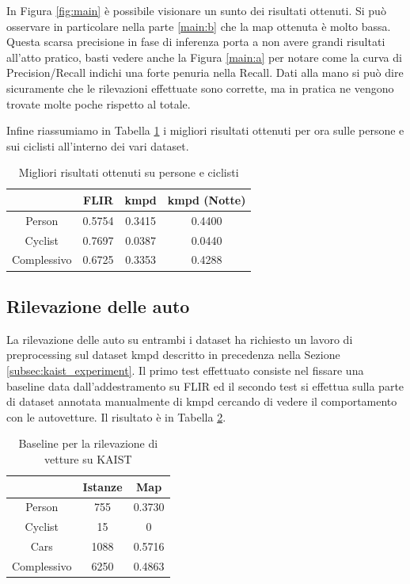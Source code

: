 In Figura \ref{fig:main} è possibile visionare un sunto dei risultati ottenuti. Si può osservare in particolare nella parte \ref{main:b} che la \ac{map} ottenuta è molto bassa. Questa scarsa precisione in fase di inferenza porta a non avere grandi risultati all'atto pratico, basti vedere anche la Figura \ref{main:a} per notare come la curva di Precision/Recall indichi una forte penuria nella Recall. 
Dati alla mano si può dire sicuramente che le rilevazioni effettuate sono corrette, ma in pratica ne vengono trovate molte poche rispetto al totale. 

Infine riassumiamo in Tabella \ref{tab:best_kmpd_flir} i migliori risultati ottenuti per ora sulle persone e sui ciclisti all'interno dei vari dataset. 

\begin{table}[]
    \begin{tabular}{c|c|c|c|}
    \cline{2-4}
     & FLIR & \ac{kmpd} & \ac{kmpd} (Notte) \\ \hline
    \multicolumn{1}{|c|}{Person} & 0.5754 & 0.3415 & 0.4400 \\ \hline
    \multicolumn{1}{|c|}{Cyclist} & 0.7697 & 0.0387 & 0.0440 \\ \hline
    \multicolumn{1}{|c|}{Complessivo} & 0.6725 & 0.3353 & 0.4288 \\ \hline
    \end{tabular}
    \caption{Migliori risultati ottenuti su persone e ciclisti}
    \label{tab:best_kmpd_flir}
\end{table}

\subsection{Rilevazione delle auto} %
La rilevazione delle auto su entrambi i dataset ha richiesto un lavoro di preprocessing sul dataset \ac{kmpd} descritto in precedenza nella Sezione \ref{subsec:kaist_experiment}.
Il primo test effettuato consiste nel fissare una baseline data dall'addestramento su FLIR ed il secondo test si effettua sulla parte di dataset annotata manualmente di \ac{kmpd} cercando di vedere il comportamento con le autovetture. Il risultato è in Tabella \ref{table:baseline_car_kaist}. 
\begin{table}[]
    \centering
    \begin{tabular}{c|c|c|}
    \cline{2-3}
     & Istanze & Map \\ \hline
    \multicolumn{1}{|c|}{Person} & 755 & 0.3730 \\ \hline
    \multicolumn{1}{|c|}{Cyclist} & 15 & 0 \\ \hline
    \multicolumn{1}{|c|}{Cars} & 1088 & 0.5716 \\ \hline
    \multicolumn{1}{|c|}{Complessivo} & 6250 & 0.4863 \\ \hline
    \end{tabular}
    \caption{Baseline per la rilevazione di vetture su KAIST}
    \label{table:baseline_car_kaist}
\end{table} 

